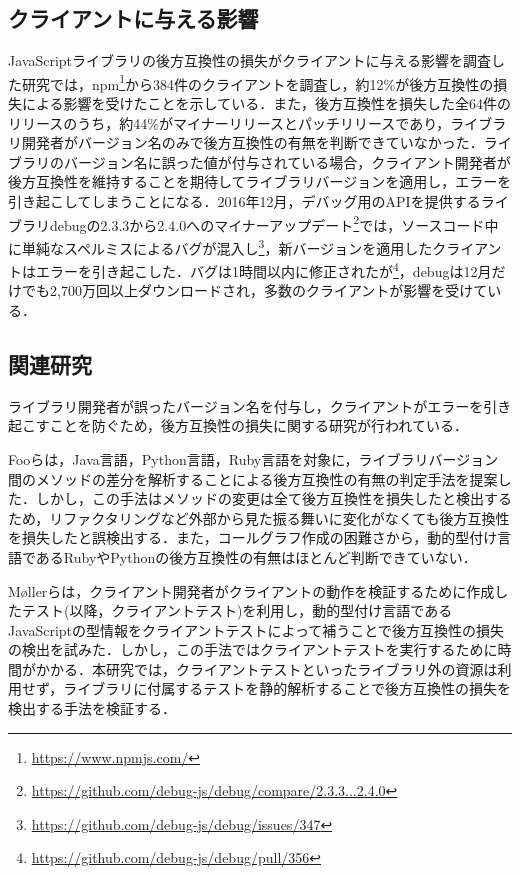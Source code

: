 \documentclass[submit]{ipsj}
\begin{document}
\subsection{クライアントに与える影響}
JavaScriptライブラリの後方互換性の損失がクライアントに与える影響を調査した研究\cite{impact-analysis-for-clients}では，npm\footnote{\url{https://www.npmjs.com/}}から384件のクライアントを調査し，約12\%が後方互換性の損失による影響を受けたことを示している．また，後方互換性を損失した全64件のリリースのうち，約44\%がマイナーリリースとパッチリリースであり，ライブラリ開発者がバージョン名のみで後方互換性の有無を判断できていなかった．ライブラリのバージョン名に誤った値が付与されている場合，クライアント開発者が後方互換性を維持することを期待してライブラリバージョンを適用し，エラーを引き起こしてしまうことになる．2016年12月，デバッグ用のAPIを提供するライブラリdebugの2.3.3から2.4.0へのマイナーアップデート\footnote{\url{https://github.com/debug-js/debug/compare/2.3.3...2.4.0}}では，ソースコード中に単純なスペルミスによるバグが混入し\footnote{\url{https://github.com/debug-js/debug/issues/347}}，新バージョンを適用したクライアントはエラーを引き起こした．バグは1時間以内に修正されたが\footnote{\url{https://github.com/debug-js/debug/pull/356}}，debugは12月だけでも2,700万回以上ダウンロードされ，多数のクライアントが影響を受けている．

\subsection{関連研究}
ライブラリ開発者が誤ったバージョン名を付与し，クライアントがエラーを引き起こすことを防ぐため，後方互換性の損失に関する研究が行われている\cite{How_Do_Api_Evolve}\cite{A_Study_on_Behavioral}\cite{How_to_Break_an_API}．

Fooらは，Java言語，Python言語，Ruby言語を対象に，ライブラリバージョン間のメソッドの差分を解析することによる後方互換性の有無の判定手法を提案した\cite{foo}．しかし，この手法はメソッドの変更は全て後方互換性を損失したと検出するため，リファクタリングなど外部から見た振る舞いに変化がなくても後方互換性を損失したと誤検出する．また，コールグラフ作成の困難さから，動的型付け言語であるRubyやPythonの後方互換性の有無はほとんど判断できていない．

M{\o}llerらは，クライアント開発者がクライアントの動作を検証するために作成したテスト(以降，クライアントテスト)を利用し，動的型付け言語であるJavaScriptの型情報をクライアントテストによって補うことで後方互換性の損失の検出を試みた\cite{type-regression-testing}\cite{model-based-testing}．しかし，この手法ではクライアントテストを実行するために時間がかかる．本研究では，クライアントテストといったライブラリ外の資源は利用せず，ライブラリに付属するテストを静的解析することで後方互換性の損失を検出する手法を検証する．
\end{document}
